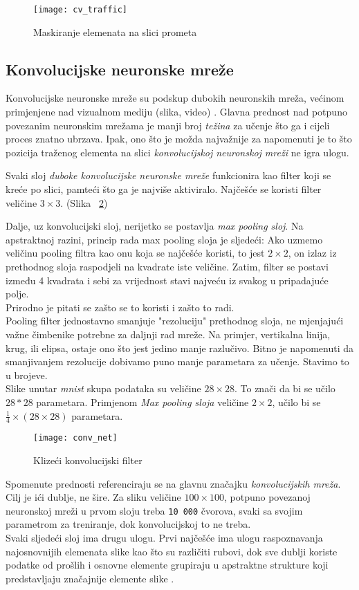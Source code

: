 \begin{figure}[h!]
	\centering
	\texttt{[image: cv\_traffic]}
	 \caption{Maskiranje elemenata na slici prometa}
 	 \label{fig:cv_traffic_1}
\end{figure}

\subsection{Konvolucijske neuronske mreže}
Konvolucijske neuronske mreže su podskup dubokih neuronskih mreža, većinom primjenjene nad vizualnom mediju (slika, video) \cite{ConvNet}.
Glavna prednost nad potpuno povezanim neuronskim mrežama je manji broj \emph{težina} za učenje što ga i cijeli proces znatno ubrzava. 
Ipak, ono što je možda najvažnije za napomenuti je to što pozicija traženog elementa na slici \emph{konvolucijskoj neuronskoj mreži} ne igra ulogu. 

Svaki sloj \emph{duboke konvolucijske neuronske mreže} funkcionira kao filter koji se kreće po slici, pamteći što ga je najviše aktiviralo. Najčešće se koristi filter veličine $3\times3$.
(Slika ~\ref{fig:conv_net_1})

Dalje, uz konvolucijski sloj, nerijetko se postavlja \emph{max pooling sloj}.
Na apstraktnoj razini, princip rada max pooling sloja je sljedeći: Ako uzmemo veličinu pooling filtra kao onu koja se najčešće koristi, to jest $2\times2$, on izlaz iz prethodnog sloja raspodjeli na kvadrate iste veličine. Zatim, filter se postavi između 4 kvadrata i sebi za vrijednost stavi najveću iz svakog u pripadajuće polje. \\ 
Prirodno je pitati se zašto se to koristi i zašto to radi. \\
Pooling filter jednostavno smanjuje "rezoluciju" prethodnog sloja, ne mjenjajući važne čimbenike potrebne za daljnji rad mreže. 
Na primjer, vertikalna linija, krug, ili elipsa, ostaje ono što jest jedino manje razlučivo. 
Bitno je napomenuti da smanjivanjem rezolucije dobivamo puno manje parametara za učenje. 
Stavimo to u brojeve. \\
Slike unutar \emph{mnist} skupa podataka su veličine $28\times28$.
To znači da bi se učilo $28*28$ parametara. 
Primjenom \emph{Max pooling sloja} veličine $2\times2$, učilo bi se $\frac{1}{4}\times(28\times28)$ parametara. 

\begin{figure}[h!]
	\centering
	\texttt{[image: conv\_net]}
	 \caption{Klizeći konvolucijski filter}
 	 \label{fig:conv_net_1}
\end{figure}

Spomenute prednosti referenciraju se na glavnu značajku \emph{konvolucijskih mreža}. 
Cilj je ići dublje, ne šire. 
Za sliku veličine $100\times100$, potpuno povezanoj neuronskoj mreži u prvom sloju treba \texttt{10 000} čvorova, svaki sa svojim parametrom za treniranje, dok konvolucijskoj to ne treba. \\
Svaki sljedeći sloj ima drugu ulogu. 
Prvi najčešće ima ulogu raspoznavanja najosnovnijih elemenata slike kao što su različiti rubovi, dok sve dublji koriste podatke od prošlih i osnovne elemente grupiraju u apstraktne strukture koji predstavljaju značajnije elemente slike \cite{o2015introduction}.
